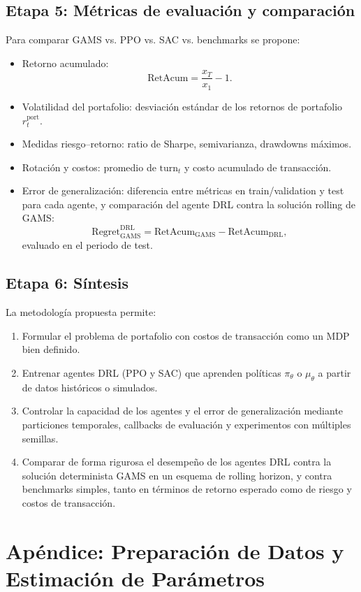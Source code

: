 \documentclass[12pt]{article}
\begin{document}
\subsection{Etapa 5: Métricas de evaluación y comparación}
Para comparar GAMS vs. PPO vs. SAC vs. benchmarks se propone:
\begin{itemize}
    \item Retorno acumulado:
    $$\text{RetAcum} = \frac{x_T}{x_1} - 1.$$
    \item Volatilidad del portafolio: desviación estándar de los retornos de portafolio $r^{\text{port}}_t$.
    \item Medidas riesgo–retorno: ratio de Sharpe, semivarianza, drawdowns máximos.
    \item Rotación y costos: promedio de $\text{turn}_t$ y costo acumulado de transacción.
    \item Error de generalización: diferencia entre métricas en train/validation y test para cada agente, y comparación del agente DRL contra la solución rolling de GAMS:
    $$\text{Regret}_{\text{GAMS}}^{\text{DRL}} = \text{RetAcum}_{\text{GAMS}} - \text{RetAcum}_{\text{DRL}},$$
    evaluado en el periodo de test.
\end{itemize}

\subsection{Etapa 6: Síntesis}
La metodología propuesta permite:
\begin{enumerate}
    \item Formular el problema de portafolio con costos de transacción como un MDP bien definido.
    \item Entrenar agentes DRL (PPO y SAC) que aprenden políticas $\pi_\theta$ o $\mu_\theta$ a partir de datos históricos o simulados.
    \item Controlar la capacidad de los agentes y el error de generalización mediante particiones temporales, callbacks de evaluación y experimentos con múltiples semillas.
    \item Comparar de forma rigurosa el desempeño de los agentes DRL contra la solución determinista GAMS en un esquema de rolling horizon, y contra benchmarks simples, tanto en términos de retorno esperado como de riesgo y costos de transacción.
\end{enumerate}



\clearpage
\section{Apéndice: Preparación de Datos y Estimación de Parámetros}
\end{document}
